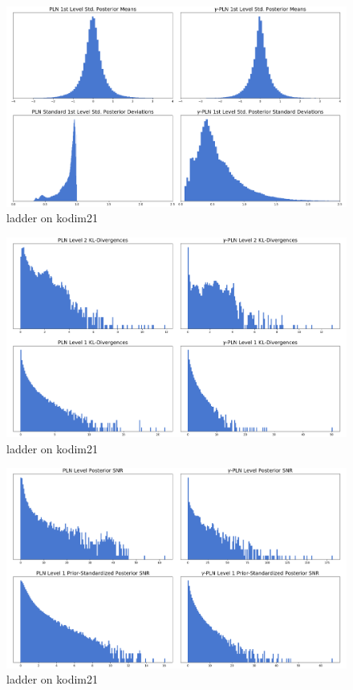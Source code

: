 \documentclass{article}
\begin{document}
\begin{figure}[H]
  \centering
  \includegraphics[width=\textwidth]{../img/plots/vae_latents/ladder_gamma_std_q1_comp}
  \caption{ladder on kodim21}
  \label{fig:ladder_gamma_std_q1_comp}
\end{figure}
\begin{figure}[H]
  \centering
  \includegraphics[width=\textwidth]{../img/plots/vae_latents/ladder_gamma_kl_comp}
  \caption{ladder on kodim21}
  \label{fig:ladder_gamma_kl_comp}
\end{figure}
\begin{figure}[H]
  \centering
  \includegraphics[width=\textwidth]{../img/plots/vae_latents/ladder_gamma_snr_comp}
  \caption{ladder on kodim21}
  \label{fig:ladder_gamma_snr_comp}
\end{figure}
\end{document}
